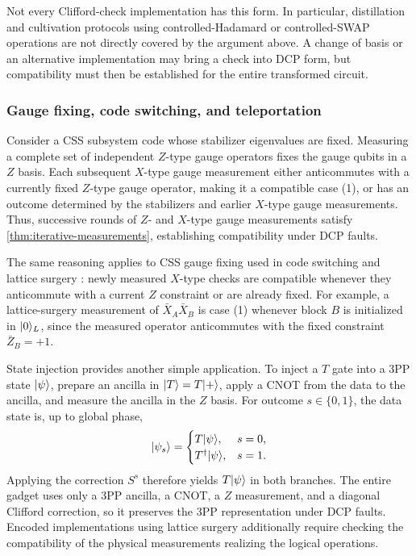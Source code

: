 Not every Clifford-check implementation has this form.
In particular, distillation and cultivation protocols using controlled-Hadamard or controlled-SWAP operations \cite{chamberland2020very, jones2013multilevel, knill2004faulttolerant, meier2012magicstate} are not directly covered by the argument above.
A change of basis or an alternative implementation may bring a check into DCP form, but compatibility must then be established for the entire transformed circuit.

\subsubsection{Gauge fixing, code switching, and teleportation}

Consider a CSS subsystem code whose stabilizer eigenvalues are fixed.
Measuring a complete set of independent $Z$-type gauge operators fixes the gauge qubits in a $Z$ basis.
Each subsequent $X$-type gauge measurement either anticommutes with a currently fixed $Z$-type gauge operator, making it a compatible case (1), or has an outcome determined by the stabilizers and earlier $X$-type gauge measurements.
Thus, successive rounds of $Z$- and $X$-type gauge measurements satisfy \cref{thm:iterative-measurements}, establishing compatibility under DCP faults.

The same reasoning applies to CSS gauge fixing used in code switching \cite{bombin2014gauge} and lattice surgery \cite{horsman2012surface}: newly measured $X$-type checks are compatible whenever they anticommute with a current $Z$ constraint or are already fixed.
For example, a lattice-surgery measurement of $\bar X_A\bar X_B$ is case (1) whenever block $B$ is initialized in $|0\rangle_L$, since the measured operator anticommutes with the fixed constraint $\bar Z_B=+1$.

State injection provides another simple application.
To inject a $T$ gate into a 3PP state $|\psi\rangle$, prepare an ancilla in $|T\rangle=T|+\rangle$, apply a CNOT from the data to the ancilla, and measure the ancilla in the $Z$ basis.
For outcome $s\in\{0,1\}$, the data state is, up to global phase,
\begin{align}
    |\psi_s\rangle=
    \begin{cases}
        T|\psi\rangle, & s=0,\\
        T^\dagger|\psi\rangle, & s=1.
    \end{cases}
\end{align}
Applying the correction $S^s$ therefore yields $T|\psi\rangle$ in both branches.
The entire gadget uses only a 3PP ancilla, a CNOT, a $Z$ measurement, and a diagonal Clifford correction, so it preserves the 3PP representation under DCP faults.
Encoded implementations using lattice surgery additionally require checking the compatibility of the physical measurements realizing the logical operations.

